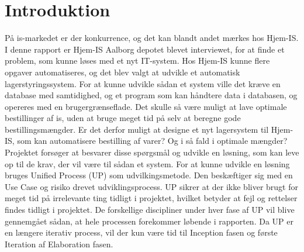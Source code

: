 \chapter{Introduktion}\label{ch:introduction}
På is-markedet er der konkurrence, og det kan blandt andet mærkes hos Hjem-IS. I denne rapport er Hjem-IS Aalborg depotet blevet interviewet, for at finde et problem, som kunne løses med et nyt IT-system.  
Hos Hjem-IS kunne flere opgaver automatiseres, og det blev valgt at udvikle et automatisk lagerstyringssystem. For at kunne udvikle sådan et system ville det kræve en database med samtidighed, og et program som kan håndtere data i databasen, og opereres med en brugergrænseflade. 
Det skulle så være muligt at lave optimale bestillinger af is, uden at bruge meget tid på selv at beregne gode bestillingsmængder. Er det derfor muligt at designe et nyt lagersystem til Hjem-IS, som kan automatisere bestilling af varer? Og i så fald i optimale mængder? 
Projektet forsøger at besvarer disse spørgsmål og udvikle en løsning, som kan leve op til de krav, der vil være til sådan et system. For at kunne udvikle en løsning bruges Unified Process (UP)\cite{UnifiedProcess} som udvilkingsmetode. Den beskæftiger sig med en Use Case og risiko drevet udviklingsprocess. UP sikrer at der ikke bliver brugt for meget tid på irrelevante ting tidligt i projektet, hvilket betyder at fejl og rettelser findes tidligt i projektet. De forskellige discipliner under hver fase af UP vil blive gennemgået sådan, at hele processen forekommer løbende i rapporten. Da UP er en længere iterativ process, vil der kun være tid til Inception fasen og første Iteration af Elaboration fasen\cite{UnifiedProcess}.